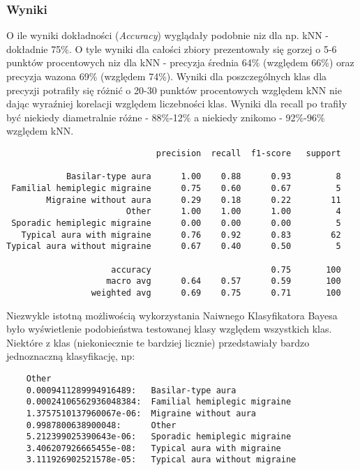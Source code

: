 \subsubsection{Wyniki}
O ile wyniki dokładności (\textit{Accuracy}) wyglądały podobnie niz dla np. kNN - dokładnie 75\%. O tyle wyniki dla całości zbiory prezentowały się gorzej o 5-6 punktów procentowych niz dla kNN - precyzja średnia 64\% (względem 66\%) oraz precyzja wazona 69\% (względem 74\%). Wyniki dla poszczególnych klas dla precyzji potrafiły się różnić o 20-30 punktów procentowych względem kNN nie dając wyraźniej korelacji względem liczebności klas. Wyniki dla recall po trafiły być niekiedy diametralnie różne - 88\%-12\% a niekiedy znikomo - 92\%-96\% względem kNN.\\

\begin{verbatim}
                              precision  recall  f1-score   support

            Basilar-type aura      1.00    0.88      0.93         8
 Familial hemiplegic migraine      0.75    0.60      0.67         5
        Migraine without aura      0.29    0.18      0.22        11
                        Other      1.00    1.00      1.00         4
 Sporadic hemiplegic migraine      0.00    0.00      0.00         5
   Typical aura with migraine      0.76    0.92      0.83        62
Typical aura without migraine      0.67    0.40      0.50         5

                     accuracy                        0.75       100
                    macro avg      0.64    0.57      0.59       100
                 weighted avg      0.69    0.75      0.71       100
\end{verbatim}

Niezwykle istotną możliwością wykorzystania Naiwnego Klasyfikatora Bayesa było wyświetlenie podobieństwa testowanej klasy względem wszystkich klas.\\

Niektóre z klas (niekoniecznie te bardziej licznie) przedstawiały bardzo jednoznaczną klasyfikację, np:\\

\begin{verbatim}
    Other
    0.0009411289994916489: 	 Basilar-type aura
    0.00024106562936048384:  Familial hemiplegic migraine
    1.3757510137960067e-06:  Migraine without aura
    0.9987800638900048:      Other
    5.212399025390643e-06: 	 Sporadic hemiplegic migraine
    3.406207926665455e-08: 	 Typical aura with migraine
    3.111926902521578e-05: 	 Typical aura without migraine
\end{verbatim}

